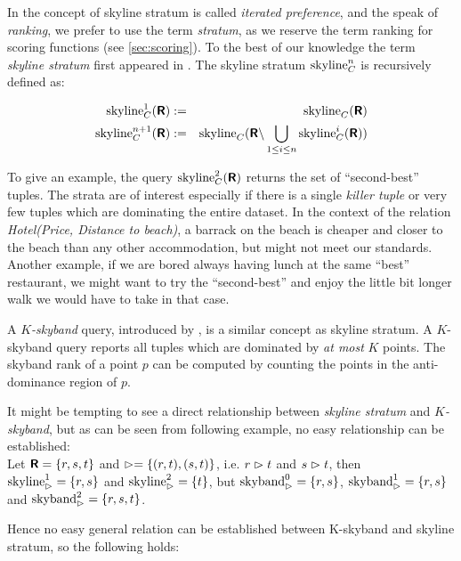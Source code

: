 In \citep{Chomicki2003a} the concept of skyline stratum is called
\emph{iterated preference}, and the speak of 
\emph{ranking}, we prefer to use the term
\emph{stratum}, as we reserve the term ranking for
scoring functions (see \autoref{sec:scoring}).
To the best of our knowledge the term \emph{skyline stratum} first 
appeared in \citep{Chan2005}.
The  skyline stratum $\skyline_C^n$ is recursively defined as:

\begin{eqnarray}
\skyline_C^1(\relation{R}) & := & \skyline_C(\relation{R}) \\
\skyline_C^{n+1}(\relation{R}) & := & \skyline_C(\relation{R} \difference \bigunion_{1 \le i \le n} \skyline_C^i(\relation{R}))
\end{eqnarray}

To give an example, the query $\skyline_C^2(\relation{R})$ returns
the set of ``second-best'' tuples.
%
The strata are of interest especially if there is a single
\emph{killer tuple} or very few tuples which are dominating the entire
dataset.  In the context of the relation \emph{Hotel(Price, Distance
to beach)}, a barrack on the beach is cheaper and closer to the beach
than any other accommodation, but might not meet our
standards.  Another example, if we are bored always having lunch at the
same ``best'' restaurant, we might want to try the ``second-best'' and
enjoy the little bit longer walk we would have to take in that case.

A \emph{$K$-skyband} query, introduced by
\citet{Papadias2005}, is a similar concept as skyline stratum. A
$K$-skyband query reports all tuples which are dominated by \emph{at most}
$K$ points.  
The skyband rank of a point $p$ can be computed by counting the points
in the anti-dominance region of $p$.

It might be tempting to see a direct relationship between
\emph{skyline stratum} and \emph{$K$-skyband}, but as can be seen from
following example, no easy relationship can be established: \\
Let $\textnormal{\bf\textsf{R}} = \{r, s, t\}$ and $\vartriangleright =\{(r,t), (s,t)\}$, 
i.e. $r \vartriangleright t$ and $s \vartriangleright t$, 
then $\skyline_\dominates^1 = \{r, s\}$ and $\skyline_\dominates^2 = \{t\}$, 
but $\skyband_\dominates^0 = \{r, s\}$, $\skyband_\dominates^1 = \{r, s\}$ and
$\skyband_\dominates^2 = \{r, s, t\}$.

\noindent
Hence no easy general relation can be established between K-skyband
and skyline stratum, so the following holds:



